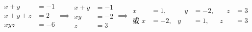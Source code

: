 \documentclass[nofonts]{ctexart}
\begin{document}
\begin{equation}
	\begin{aligned}
		x+y	&= -1	\\
		x+y+z	&= 2	\\
		xyz	&= -6
	\end{aligned}
	\implies
	\begin{aligned}
		x+y	&= -1	\\
		xy	&= -2	\\
		z	&= 3
	\end{aligned}
	\implies
	\begin{alignedat}{3}
		x		&= 1,	&\quad	y &= -2, &\quad z &= 3	\\
		\text{或\ } x	&= -2,  &       y &= 1,  &      z &= 3
	\end{alignedat}
\end{equation}
\end{document}
